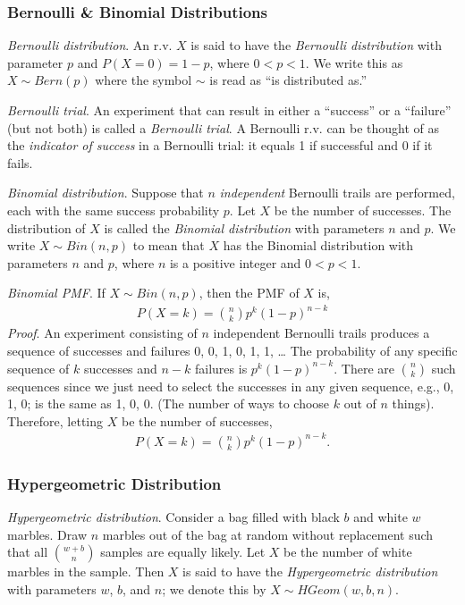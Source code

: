 \subsubsection{Bernoulli \& Binomial Distributions}

\emph{Bernoulli distribution}. 
An r.v. \(X\) is said to have the \emph{Bernoulli distribution} 
with parameter \(p\) and \(P(X = 0) = 1 - p\), 
where \(0 < p < 1\). 
We write this as \(X \sim Bern(p)\) 
where the symbol \(\sim\) is read as ``is distributed as.''

\emph{Bernoulli trial}. 
An experiment that can result in either a ``success'' 
or a ``failure'' (but not both) is called a \emph{Bernoulli trial}. 
A Bernoulli r.v. can be thought of as the \emph{indicator of success} in a Bernoulli trial: 
it equals 1 if successful and 0 if it fails.

\emph{Binomial distribution}. 
Suppose that \(n\) \emph{independent} Bernoulli trails are performed, 
each with the same success probability \(p\). 
Let \(X\) be the number of successes. 
The distribution of \(X\) is called the \emph{Binomial distribution} with parameters \(n\) and \(p\). 
We write \(X \sim Bin(n,p)\) to mean that \(X\) has the
Binomial distribution with parameters \(n\) and \(p\), 
where \(n\) is a positive integer and \(0 < p < 1\).

\emph{Binomial PMF}. 
If \(X \sim Bin(n,p)\), 
then the PMF of \(X\) is,
\begin{align}
P(X = k) = \binom{n}{k}p^{k}(1 - p)^{n - k}
\end{align}
\emph{Proof}. 
An experiment consisting of \(n\) independent Bernoulli
trails produces a sequence of successes and failures 0, 0, 1, 0, 1, 1, \ldots{} 
The probability of any specific sequence of \(k\) successes and \(n - k\) failures is \(p^{k}(1 - p)^{n - k}\). 
There are \(\binom{n}{k}\) such sequences since we just need to select the
successes in any given sequence, e.g., 0, 1, 0; is the same as 1, 0, 0.
(The number of ways to choose \(k\) out of \(n\) things). 
Therefore, letting \(X\) be the number of successes,
\begin{align}
P(X = k) = \binom{n}{k}p^{k}(1 - p)^{n - k}.
\end{align}

\subsubsection{Hypergeometric Distribution}

\emph{Hypergeometric distribution}. 
Consider a bag filled with black \(b\) and white \(w\) marbles. 
Draw \(n\) marbles out of the bag at random without 
replacement such that all \(\binom{w + b}{n}\) samples are equally likely. 
Let \(X\) be the number of white marbles in the sample. 
Then \(X\) is said to have the \emph{Hypergeometric distribution} 
with parameters \(w\), \(b\), and \(n\); 
we denote this by \(X \sim HGeom(w,b,n)\).

